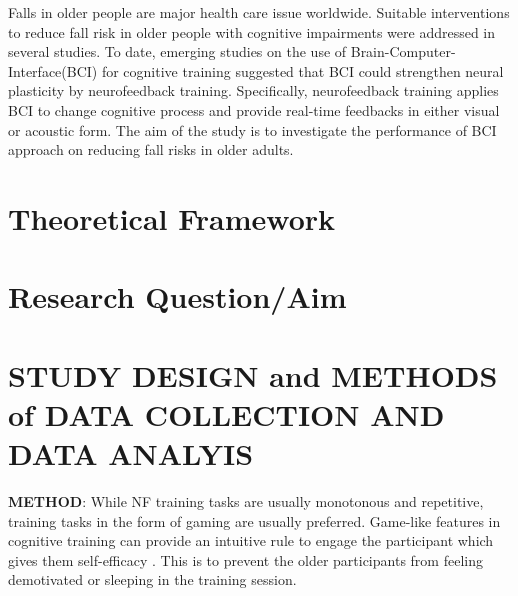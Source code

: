 \documentclass{article}
\begin{document}
Falls in older people are major health care issue worldwide. Suitable interventions to reduce fall risk in older people with cognitive impairments were addressed in several studies. To date, emerging studies on the use of Brain-Computer-Interface(BCI) for cognitive training suggested that BCI could strengthen neural plasticity by neurofeedback training. Specifically, neurofeedback training applies BCI to change cognitive process and provide real-time feedbacks in either visual or acoustic form. The aim of the study is to investigate the performance of BCI approach on reducing fall risks in older adults.

\section{Theoretical Framework}


\section{Research Question/Aim}


\section{STUDY DESIGN and METHODS of DATA COLLECTION AND DATA ANALYIS}
\textbf{METHOD}: While NF training tasks are usually monotonous and repetitive, training tasks in the form of gaming are usually preferred. Game-like features in cognitive training can provide an intuitive rule to engage the participant which gives them self-efficacy \cite{McGonigal_2011}. This is to prevent the older participants from feeling demotivated or sleeping in the training session. 


\printbibliography
\end{document}

